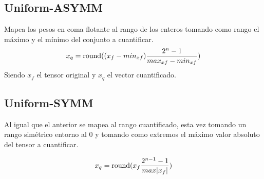 \subsection{Uniform-ASYMM}
Mapea los pesos en coma flotante al rango de los enteros tomando como rango el máximo y el mínimo del conjunto a cuantificar. 
\begin{equation}
x_{q} = \operatorname{round}((x_f - min_{xf})\frac{2^n-1}{max_{xf}-min_{xf}})
\end{equation}
Siendo $x_f$ el tensor original y $x_q$ el vector cuantificado.

\subsection{Uniform-SYMM}
Al igual que el anterior se mapea al rango cuantificado, esta vez tomando un rango simétrico entorno al 0 y tomando como extremos el máximo valor absoluto del tensor a cuantificar.

\begin{equation}
    x_q = \operatorname{round}(x_f\frac{2^{n-1}-1}{max|x_f|})
\end{equation}


